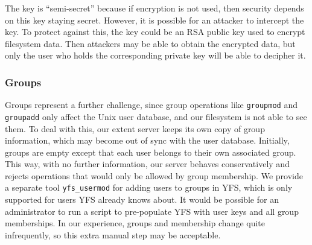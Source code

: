 \documentclass[12pt]{article}
\begin{document}
The key is ``semi-secret'' because if encryption is not used, then
security depends on this key staying secret. However, it is possible
for an attacker to intercept the key. To protect against this, the
key could be an RSA public key used to encrypt filesystem data. Then
attackers may be able to obtain the encrypted data, but only the user
who holds the corresponding private key will be able to decipher it.

\subsubsection{Groups}

Groups represent a further challenge, since group operations like
{\tt groupmod} and {\tt groupadd} only affect the Unix user database,
and our filesystem is not able to see them. To deal with this, our
extent server keeps its own copy of group information, which may become
out of sync with the user database. Initially, groups are empty except
that each user belongs to their own associated group. This way, with
no further information, our server behaves conservatively and rejects
operations that would only be allowed by group membership. We provide
a separate tool {\tt yfs\_usermod} for adding users to groups in YFS,
which is only supported for users YFS already knows about. It would be
possible for an administrator to run a script to pre-populate YFS
with user keys and all group memberships. In our experience, groups
and membership change quite infrequently, so this extra manual step
may be acceptable.
\end{document}
